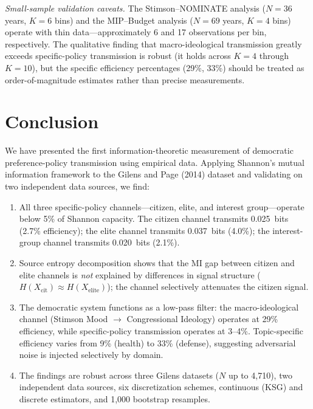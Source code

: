 \documentclass[twocolumn,10pt]{article}
\begin{document}
\emph{Small-sample validation caveats.}  The Stimson--NOMINATE analysis ($N{=}36$ years, $K{=}6$ bins) and the MIP--Budget analysis ($N{=}69$ years, $K{=}4$ bins) operate with thin data---approximately 6 and 17 observations per bin, respectively.  The qualitative finding that macro-ideological transmission greatly exceeds specific-policy transmission is robust (it holds across $K{=}4$ through $K{=}10$), but the specific efficiency percentages (29\%, 33\%) should be treated as order-of-magnitude estimates rather than precise measurements.

\section{Conclusion}
\label{sec:conclusion}

We have presented the first information-theoretic measurement of democratic preference-policy transmission using empirical data.  Applying Shannon's mutual information framework to the Gilens and Page (2014) dataset and validating on two independent data sources, we find:

\begin{enumerate}
\item All three specific-policy channels---citizen, elite, and interest group---operate below 5\% of Shannon capacity.  The citizen channel transmits 0.025~bits (2.7\% efficiency); the elite channel transmits 0.037~bits (4.0\%); the interest-group channel transmits 0.020~bits (2.1\%).

\item Source entropy decomposition shows that the MI gap between citizen and elite channels is \emph{not} explained by differences in signal structure ($H(X_\text{cit}) \approx H(X_\text{elite})$); the channel selectively attenuates the citizen signal.

\item The democratic system functions as a low-pass filter: the macro-ideological channel (Stimson Mood $\to$ Congressional Ideology) operates at 29\% efficiency, while specific-policy transmission operates at 3--4\%.  Topic-specific efficiency varies from 9\% (health) to 33\% (defense), suggesting adversarial noise is injected selectively by domain.

\item The findings are robust across three Gilens datasets ($N$ up to 4,710), two independent data sources, six discretization schemes, continuous (KSG) and discrete estimators, and 1,000 bootstrap resamples.
\end{enumerate}
\end{document}

